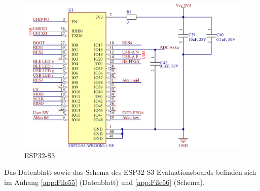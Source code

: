 \begin{figure}[H]
    \centering
    \includegraphics[width=0.8\linewidth]{Figures/Chap3/Schematics/ESP32.png}
    \caption{ESP32-S3}
    \label{fig:ESP32}
\end{figure}

Das Datenblatt sowie das Schema des ESP32-S3 Evaluationsboards befinden sich im Anhang \ref{app:File55} (Datenblatt) und \ref{app:File56} (Schema).

